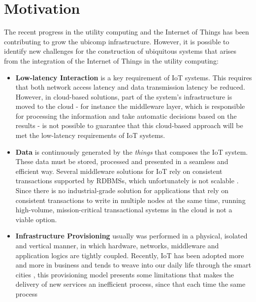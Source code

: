 \section{Motivation}
\label{section:motivation}
The recent progress in the utility computing and the Internet of Things has been contributing to grow the
\gls{ubicomp} infrastructure. However, it is possible to identify new challenges \cite{caceres2012ubicomp}
for the construction of ubiquitous systems that arises from the integration of the Internet of Things
in the utility computing:

\begin{itemize}
  \item \textbf{Low-latency Interaction} is a key requirement of \gls{IoT} systems. This requires that
  both network access latency and data transmission latency be reduced. However, in cloud-based solutions,
  part of the system's infrastructure is moved to the cloud - for instance the middleware layer,
  which is responsible for processing the information and take automatic decisions based on the results
  - is not possible to guarantee that this cloud-based approach will be met the low-latency requirements
  of \gls{IoT} systems.
  \item \textbf{Data} is continuously generated by the \textit{things} that composes the \gls{IoT}
  system. These data must be stored, processed and presented in a seamless and efficient way. Several
  middleware solutions for \gls{IoT} \cite{floerkemeier2007rfid}\cite{eisenhauer2010hydra}\cite{de2008socrades}
  rely on consistent transactions supported by \glspl{RDBMS}, which unfortunately is not scalable
  \cite{hofmann2010cloud}. Since there is no industrial-grade solution for applications that rely on
  consistent transactions to write in multiple nodes at the same time, running high-volume, mission-critical
  transactional systems in the cloud is not a viable option.
  \item \textbf{Infrastructure Provisioning} usually was performed in a physical, isolated and vertical
  manner, in which hardware, networks, middleware and application logics are tightly coupled. Recently,
  \gls{IoT} has been adopted more and more in business and tends to weave into our daily life through the smart cities
  \cite{caragliu2011smart}\cite{schaffers2011smart}, this provisioning model presents some limitations
  that makes the delivery of new services an inefficient process, since that each time the same process

\end{itemize}
